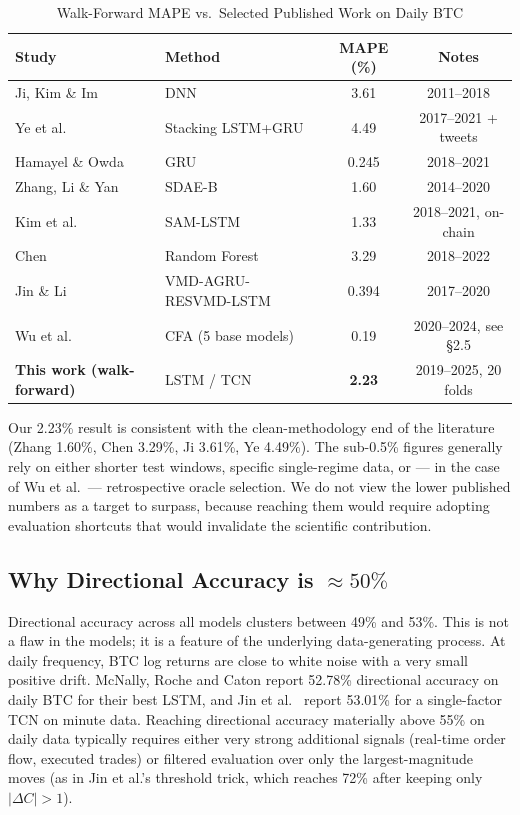 \documentclass[12pt]{article}
\begin{document}
\begin{table}[h!]
\centering
\small
\caption{Walk-Forward MAPE vs.\ Selected Published Work on Daily BTC}
\label{tab:literature}
\begin{tabular}{@{}llcc@{}}
\toprule
\textbf{Study} & \textbf{Method} & \textbf{MAPE (\%)} & \textbf{Notes} \\
\midrule
Ji, Kim \& Im \cite{ji2019}       & DNN                  & 3.61  & 2011--2018 \\
Ye et al.\ \cite{ye2021}          & Stacking LSTM+GRU    & 4.49  & 2017--2021 + tweets \\
Hamayel \& Owda \cite{hamayel2021}& GRU                  & 0.245 & 2018--2021 \\
Zhang, Li \& Yan \cite{zhang2022} & SDAE-B               & 1.60  & 2014--2020 \\
Kim et al.\ \cite{kim2022}        & SAM-LSTM             & 1.33  & 2018--2021, on-chain \\
Chen \cite{chen2020_rf}           & Random Forest        & 3.29  & 2018--2022 \\
Jin \& Li \cite{jin2023}          & VMD-AGRU-RESVMD-LSTM & 0.394 & 2017--2020 \\
Wu et al.\ \cite{wu2025cfa}       & CFA (5 base models)  & 0.19  & 2020--2024, see \S 2.5 \\
\textbf{This work (walk-forward)} & LSTM / TCN           & \textbf{2.23}  & 2019--2025, 20 folds \\
\bottomrule
\end{tabular}
\end{table}

Our 2.23\% result is consistent with the clean-methodology end of the literature (Zhang 1.60\%, Chen 3.29\%, Ji 3.61\%, Ye 4.49\%). The sub-0.5\% figures generally rely on either shorter test windows, specific single-regime data, or --- in the case of Wu et al.\ --- retrospective oracle selection. We do not view the lower published numbers as a target to surpass, because reaching them would require adopting evaluation shortcuts that would invalidate the scientific contribution.

\subsection{Why Directional Accuracy is $\approx 50\%$}

Directional accuracy across all models clusters between 49\% and 53\%. This is not a flaw in the models; it is a feature of the underlying data-generating process. At daily frequency, BTC log returns are close to white noise with a very small positive drift. McNally, Roche and Caton \cite{mcnally2018} report 52.78\% directional accuracy on daily BTC for their best LSTM, and Jin et al.\ \cite{jin2025tcn} report 53.01\% for a single-factor TCN on minute data. Reaching directional accuracy materially above 55\% on daily data typically requires either very strong additional signals (real-time order flow, executed trades) or filtered evaluation over only the largest-magnitude moves (as in Jin et al.'s threshold trick, which reaches 72\% after keeping only $|\Delta C| > 1$).
\end{document}
